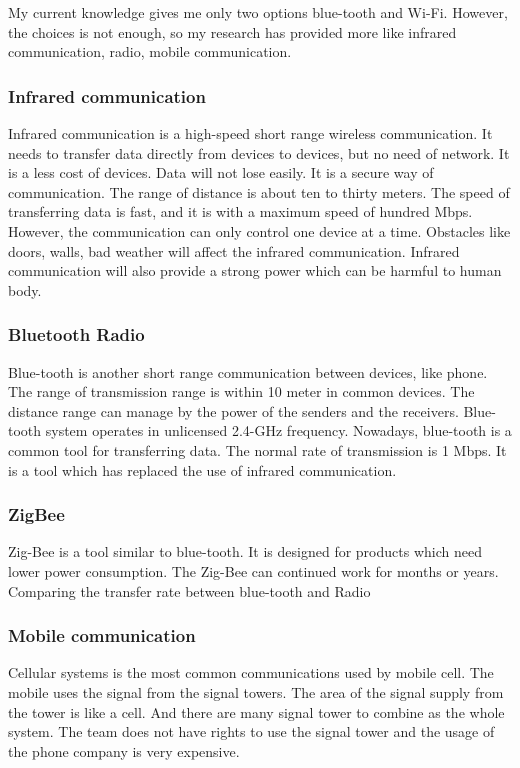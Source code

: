 \documentclass[onecolumn, draftclsnofoot,10pt, compsoc]{IEEEtran}
\begin{document}
My current knowledge gives me only two options blue-tooth and Wi-Fi.
However, the choices is not enough, so my research has provided more
like infrared communication, radio, mobile communication.

\subsubsection{Infrared communication}


Infrared communication is a high-speed short range wireless communication.\cite{r1}
It needs to transfer data directly from devices to devices, but no need of network.
It is a less cost of devices. Data will not lose easily.
It is a secure way of communication. The range of distance is about ten to thirty meters.
The speed of transferring data is fast, and it is with a maximum speed of hundred Mbps.
However, the communication can only control one device at a time.
Obstacles like doors, walls, bad weather will affect the infrared communication.
Infrared communication will also provide a strong power which can be harmful to human body.

\subsubsection{Bluetooth Radio}
Blue-tooth\cite{r2} is another short range communication between devices, like phone.
The range of transmission range is within 10 meter in common devices.
The distance range can manage by the power of the senders and the receivers.
Blue-tooth system operates in unlicensed 2.4-GHz frequency.
Nowadays, blue-tooth is a common tool for transferring data.
The normal rate of transmission is 1 Mbps.
It is a tool which has replaced the use of infrared communication.

\subsubsection{ZigBee}
Zig-Bee\cite{r2} is a tool similar to blue-tooth. It is designed for products which need lower power consumption.
The Zig-Bee can continued work for months or years. Comparing the transfer rate between blue-tooth and Radio

\subsubsection{Mobile communication}
Cellular systems is the most common communications used by mobile cell.
The mobile uses the signal from the signal towers.
The area of the signal supply from the tower is like a cell.
And there are many signal tower to combine as the whole system.
The team does not have rights to use the signal tower and
the usage of the phone company is very expensive.
\end{document}
